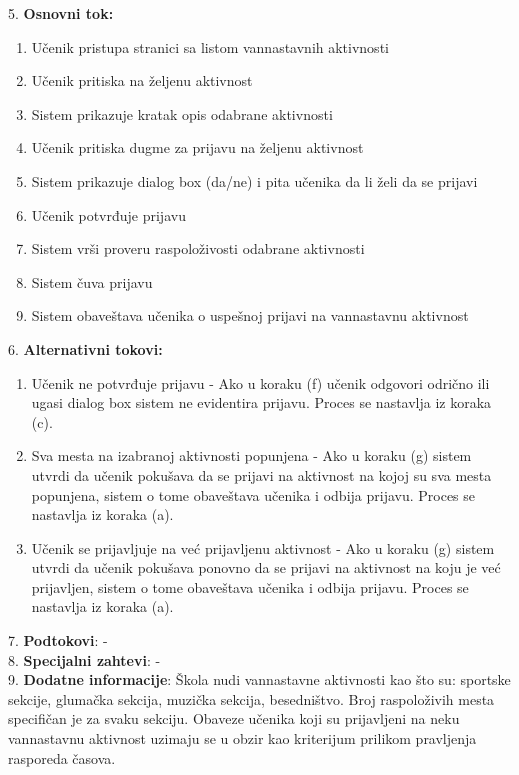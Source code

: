 \documentclass{article}
\begin{document}
5. \textbf{Osnovni tok:} 
\begin{enumerate} [label=(\alph*)]
\item Učenik pristupa stranici sa listom vannastavnih aktivnosti
\item Učenik pritiska na željenu aktivnost
\item Sistem prikazuje kratak opis odabrane aktivnosti
\item Učenik pritiska dugme za prijavu na željenu aktivnost
\item Sistem prikazuje dialog box (da/ne) i pita učenika da li želi da se prijavi
\item Učenik potvrđuje prijavu
\item Sistem vrši proveru raspoloživosti odabrane aktivnosti
\item Sistem čuva prijavu
\item Sistem obaveštava učenika o uspešnoj prijavi na vannastavnu aktivnost
\end{enumerate}

6. \textbf{Alternativni tokovi:}
\begin{enumerate} [label=(\roman*)]
\item Učenik ne potvrđuje prijavu - Ako u koraku (f) učenik odgovori odrično ili ugasi dialog box sistem ne evidentira prijavu. Proces se nastavlja iz koraka (c). 
\item Sva mesta na izabranoj aktivnosti popunjena - Ako u koraku (g) sistem utvrdi da učenik pokušava da se prijavi na aktivnost na kojoj su sva mesta popunjena, sistem o tome obaveštava učenika i odbija prijavu. Proces se nastavlja iz koraka (a).
\item Učenik se prijavljuje na već prijavljenu aktivnost - Ako u koraku (g) sistem utvrdi da učenik pokušava ponovno da se prijavi na aktivnost na koju je već prijavljen, sistem o tome obaveštava učenika i odbija prijavu. Proces se nastavlja iz koraka (a).

\end{enumerate}

7. \textbf{Podtokovi}: - \\

8. \textbf{Specijalni zahtevi}: - \\

9. \textbf{Dodatne informacije}: Škola nudi vannastavne aktivnosti kao što su: sportske sekcije, glumačka sekcija, muzička sekcija, besedništvo. Broj raspoloživih mesta specifičan je za svaku sekciju. Obaveze učenika koji su prijavljeni na neku vannastavnu aktivnost uzimaju se u obzir kao kriterijum prilikom pravljenja rasporeda časova. \\
\end{document}
